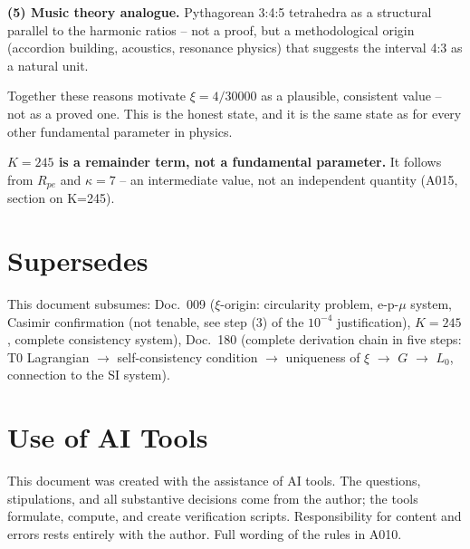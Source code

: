 \textbf{(5) Music theory analogue.} Pythagorean 3:4:5 tetrahedra as a
structural parallel to the harmonic ratios -- not a proof, but a methodological
origin (accordion building, acoustics, resonance physics) that suggests the
interval 4:3 as a natural unit.

Together these reasons motivate $\xi=4/30000$ as a plausible, consistent
value -- not as a proved one. This is the honest state, and it is the same
state as for every other fundamental parameter in physics.

\textbf{$K=245$ is a remainder term, not a fundamental parameter.} It follows
from $R_{pe}$ and $\kappa=7$ -- an intermediate value, not an independent
quantity (A015, section on K=245).

\section{Supersedes}

This document subsumes: Doc.~009 ($\xi$-origin: circularity problem, e-p-$\mu$
system, Casimir confirmation (not tenable, see step (3) of the $10^{-4}$ justification), $K=245$, complete consistency system), Doc.~180
(complete derivation chain in five steps: T0 Lagrangian $\to$ self-consistency
condition $\to$ uniqueness of $\xi$ $\to$ $G$ $\to$ $L_0$, connection to the
SI system).

\section{Use of AI Tools}

This document was created with the assistance of AI tools. The questions,
stipulations, and all substantive decisions come from the author; the tools
formulate, compute, and create verification scripts.
Responsibility for content and errors rests entirely with the author.
Full wording of the rules in A010.
